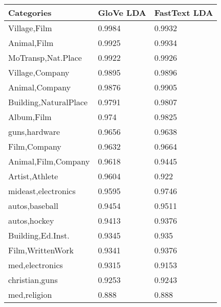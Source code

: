 \begin{table}[]
\centering
\captionsetup{skip=0.5\baselineskip,size=footnotesize,position=bottom}
\footnotesize
\label{lda_fasttext}
\begin{tabular}{lll}
\toprule
Categories                      & GloVe LDA       & FastText LDA \\
\midrule
Village,Film                               & 0.9984       & 0.9932                 \\
Animal,Film                                & 0.9925       & 0.9934                 \\
MoTransp,Nat.Place          & 0.9922       & 0.9926                 \\
Village,Company                            & 0.9895       & 0.9896                 \\
Animal,Company                             & 0.9876       & 0.9905                 \\
Building,NaturalPlace                      & 0.9791       & 0.9807                 \\
Album,Film                                 & 0.974        & 0.9825                 \\
guns,hardware                              & 0.9656       & 0.9638                 \\
Film,Company                               & 0.9632       & 0.9664                 \\
Animal,Film,Company                        & 0.9618       & 0.9445                 \\
Artist,Athlete                             & 0.9604       & 0.922                  \\
mideast,electronics                        & 0.9595       & 0.9746                 \\
autos,baseball                             & 0.9454       & 0.9511                 \\
autos,hockey                               & 0.9413       & 0.9376                 \\
Building,Ed.Inst.            & 0.9345       & 0.935                  \\
Film,WrittenWork                           & 0.9341       & 0.9376                 \\
med,electronics                            & 0.9315       & 0.9153                 \\
christian,guns                             & 0.9253       & 0.9243                 \\
med,religion                               & 0.888        & 0.888                  \\

\end{tabular}
\end{table}
